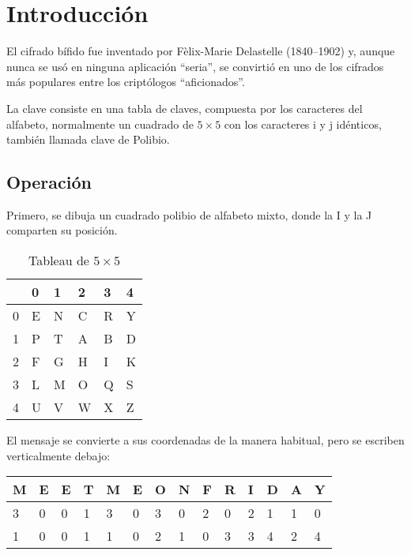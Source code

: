 \documentclass[onecolumn]{IEEEtran}
\begin{document}
\title{\tituloPractica}
\author{\autores}

\maketitle{}
\tableofcontents{}
\bigskip{}

\begin{abstract}
  En la presente se explica la forma en la cual se
  implemento el método de cifrado nombrado \textit{Bifid}
\end{abstract}


\section{Introducción}\label{sec:introduccion}
El cifrado bífido fue inventado por Fèlix-Marie Delastelle (1840--1902) y, aunque nunca se usó en ninguna aplicación ``seria'', se convirtió en uno de los cifrados más populares entre los criptólogos ``aficionados''.

La clave consiste en una tabla de claves, compuesta por los caracteres del alfabeto, normalmente un cuadrado de $5 \times 5$ con los caracteres i y j idénticos, también llamada clave de Polibio.



\subsection{Operación}\label{sec:operacion}
Primero, se dibuja un cuadrado polibio de alfabeto mixto, donde la I y la J
comparten su posición.
\begin{table}[H]
  \centering{}
  \caption{Tableau de $5 \times 5$}\label{tab:pol}
\begin{tabular}{|l|l|l|l|l|l|}
\hline
  & 0 & 1 & 2 & 3 & 4 \\ \hline
0 & E & N & C & R & Y \\ \hline
1 & P & T & A & B & D \\ \hline
2 & F & G & H & I & K \\ \hline
3 & L & M & O & Q & S \\ \hline
4 & U & V & W & X & Z \\ \hline
\end{tabular}
\end{table}

El mensaje se convierte a sus coordenadas de la manera habitual, pero
se escriben verticalmente debajo:
\begin{table}[H]
  \centering{}
\begin{tabular}{|l|l|l|l|l|l|l|l|l|l|l|l|l|l|}
\hline
M & E & E & T & M & E & O & N & F & R & I & D & A & Y \\ \hline
3 & 0 & 0 & 1 & 3 & 0 & 3 & 0 & 2 & 0 & 2 & 1 & 1 & 0 \\ \hline
1 & 0 & 0 & 1 & 1 & 0 & 2 & 1 & 0 & 3 & 3 & 4 & 2 & 4 \\ \hline
\end{tabular}
\end{table}
\end{document}
